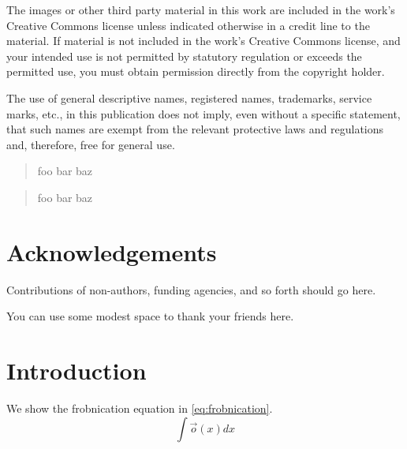 \documentclass[b5paper,10pt]{ruthesis2}
\begin{document}
The images or other third party material in this work are included in the work's Creative Commons license unless indicated otherwise in a credit line to the material.
If material is not included in the work's Creative Commons license, and your intended use is not permitted by statutory regulation or exceeds the permitted use, you must obtain permission directly from the copyright holder.

The use of general descriptive names, registered names, trademarks, service marks, etc., in this publication does not imply, even without a specific statement, that such names are exempt from the relevant protective laws and regulations and, therefore, free for general use.
\endgroup

\frontmatter

\clearpage{}
\begin{abstract}
    foo bar baz
\end{abstract}

\clearpage{}
\begin{abstract}
    foo bar baz
\end{abstract}

\clearpage{}

\tableofcontents

\chapter*{Acknowledgements}

Contributions of non-authors, funding agencies, and so forth should go here.

You can use some modest space to thank your friends here.


\mainmatter
\chapter{Introduction}

We show the frobnication equation in \eqref{eq:frobnication}.
\begin{equation}
    \label{eq:frobnication}
    \int\vec{o}(x)dx
\end{equation}

\backmatter
\end{document}
